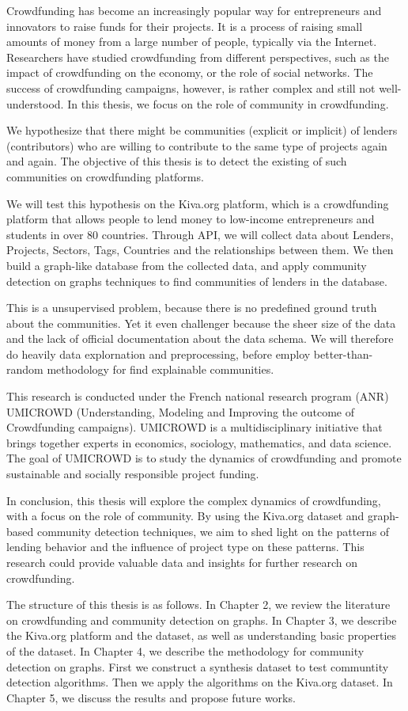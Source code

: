 Crowdfunding has become an increasingly popular way for entrepreneurs and innovators to raise funds for their projects.
It is a process of raising small amounts of money from a large number of people, typically via the Internet.
Researchers have studied crowdfunding from different perspectives, such as the impact of crowdfunding on the economy, or the role of social networks.
The success of crowdfunding campaigns, however, is rather complex and still not well-understood.
In this thesis, we focus on the role of community in crowdfunding.

We hypothesize that there might be communities (explicit or implicit) of lenders (contributors) who are willing to contribute to the same type of projects again and again.
The objective of this thesis is to detect the existing of such communities on crowdfunding platforms.

We will test this hypothesis on the Kiva.org platform,
which is a crowdfunding platform that allows people to lend money to low-income entrepreneurs and students in over 80 countries.
Through API, we will collect data about Lenders, Projects, Sectors, Tags, Countries and the relationships between them.
We then build a graph-like database from the collected data,
and apply community detection on graphs techniques to find communities of lenders in the database.

This is a unsupervised problem, because there is no predefined ground truth about the communities.
Yet it even challenger because the sheer size of the data and the lack of official documentation about the data schema.
We will therefore do heavily data explornation and preprocessing,
before employ better-than-random methodology for find explainable communities.

This research is conducted under the French national research program (ANR) UMICROWD (Understanding, Modeling and Improving the outcome of Crowdfunding campaigns).
UMICROWD is a multidisciplinary initiative that brings together experts in economics, sociology, mathematics, and data science.
The goal of UMICROWD is to study the dynamics of crowdfunding and promote sustainable and socially responsible project funding.

In conclusion, this thesis will explore the complex dynamics of crowdfunding, with a focus on the role of community.
By using the Kiva.org dataset and graph-based community detection techniques,
we aim to shed light on the patterns of lending behavior and the influence of project type on these patterns.
This research could provide valuable data and insights for further research on crowdfunding.

The structure of this thesis is as follows.
In Chapter 2, we review the literature on crowdfunding and community detection on graphs.
In Chapter 3, we describe the Kiva.org platform and the dataset,
as well as understanding basic properties of the dataset.
In Chapter 4, we describe the methodology for community detection on graphs.
First we construct a synthesis dataset to test communtity detection algorithms.
Then we apply the algorithms on the Kiva.org dataset.
In Chapter 5, we discuss the results and propose future works.
